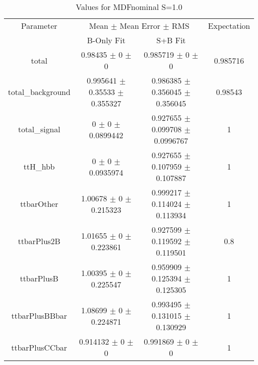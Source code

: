\begin{table}
\centering
\caption{Values for MDFnominal S=1.0}
\begin{tabular}{cccc}
\toprule
Parameter & \multicolumn{2}{c}{Mean $\pm$ Mean Error $\pm$ RMS} & Expectation\\
 & B-Only Fit & S+B Fit & \\
\midrule
total & \num{0.98435} $\pm$ \num{0} $\pm$ \num{0} & \num{0.985719} $\pm$ \num{0} $\pm$ \num{0} & \num{0.985716}\\
total\_background & \num{0.995641} $\pm$ \num{0.35533} $\pm$ \num{0.355327} & \num{0.986385} $\pm$ \num{0.356045} $\pm$ \num{0.356045} & \num{0.98543}\\
total\_signal & \num{0} $\pm$ \num{0} $\pm$ \num{0.0899442} & \num{0.927655} $\pm$ \num{0.099708} $\pm$ \num{0.0996767} & \num{1}\\
ttH\_hbb & \num{0} $\pm$ \num{0} $\pm$ \num{0.0935974} & \num{0.927655} $\pm$ \num{0.107959} $\pm$ \num{0.107887} & \num{1}\\
ttbarOther & \num{1.00678} $\pm$ \num{0} $\pm$ \num{0.215323} & \num{0.999217} $\pm$ \num{0.114024} $\pm$ \num{0.113934} & \num{1}\\
ttbarPlus2B & \num{1.01655} $\pm$ \num{0} $\pm$ \num{0.223861} & \num{0.927599} $\pm$ \num{0.119592} $\pm$ \num{0.119501} & \num{0.8}\\
ttbarPlusB & \num{1.00395} $\pm$ \num{0} $\pm$ \num{0.225547} & \num{0.959909} $\pm$ \num{0.125394} $\pm$ \num{0.125305} & \num{1}\\
ttbarPlusBBbar & \num{1.08699} $\pm$ \num{0} $\pm$ \num{0.224871} & \num{0.993495} $\pm$ \num{0.131015} $\pm$ \num{0.130929} & \num{1}\\
ttbarPlusCCbar & \num{0.914132} $\pm$ \num{0} $\pm$ \num{0} & \num{0.991869} $\pm$ \num{0} $\pm$ \num{0} & \num{1}\\
\bottomrule
\end{tabular}
\end{table}